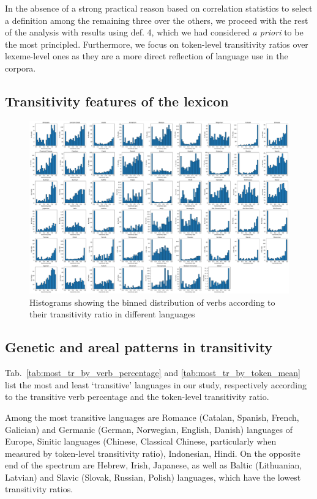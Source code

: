 In the absence of a strong practical reason based on correlation statistics to select a definition among the remaining three over the others, we proceed with the rest of the analysis with results using def. 4, which we had considered \textit{a priori} to be the most principled. Furthermore, we focus on token-level transitivity ratios over lexeme-level ones as they are a more direct reflection of language use in the corpora.

\subsection{Transitivity features of the lexicon}

\begin{figure}
  \centering
  \includegraphics[width=\textwidth]{figures/verb_dist_by_transitivity.pdf}
  \caption{Histograms showing the binned distribution of verbs according to their transitivity ratio in different languages}
  \label{fig:verb_dist_transitivity}
\end{figure}

\subsection{Genetic and areal patterns in transitivity}



Tab.~\ref{tab:most_tr_by_verb_percentage} and \ref{tab:most_tr_by_token_mean} list the most and least `transitive' languages in our study, respectively according to the transitive verb percentage and the token-level transitivity ratio.  

Among the most transitive languages are Romance (Catalan, Spanish, French, Galician) and Germanic (German, Norwegian, English, Danish) languages of Europe, Sinitic languages (Chinese, Classical Chinese, particularly when measured by token-level transitivity ratio), Indonesian, Hindi. On the opposite end of the spectrum are Hebrew, Irish, Japanese, as well as Baltic (Lithuanian, Latvian) and Slavic (Slovak, Russian, Polish) languages, which have the lowest transitivity ratios.

